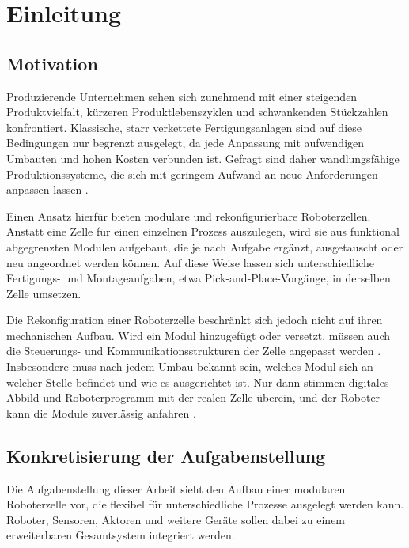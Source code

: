 \cleardoublepage
\chapter{Einleitung}
\label{ch:Einleitung}
\setcounter{page}{1}

\section{Motivation}
\label{sec:Motivation}

Produzierende Unternehmen sehen sich zunehmend mit einer steigenden Produktvielfalt, kürzeren Produktlebenszyklen und schwankenden Stückzahlen konfrontiert. Klassische, starr verkettete Fertigungsanlagen sind auf diese Bedingungen nur begrenzt ausgelegt, da jede Anpassung mit aufwendigen Umbauten und hohen Kosten verbunden ist. Gefragt sind daher wandlungsfähige Produktionssysteme, die sich mit geringem Aufwand an neue Anforderungen anpassen lassen \cite{Borgmann2026,Trautner2026}.

Einen Ansatz hierfür bieten modulare und rekonfigurierbare Roboterzellen. Anstatt eine Zelle für einen einzelnen Prozess auszulegen, wird sie aus funktional abgegrenzten Modulen aufgebaut, die je nach Aufgabe ergänzt, ausgetauscht oder neu angeordnet werden können. Auf diese Weise lassen sich unterschiedliche Fertigungs- und Montageaufgaben, etwa Pick-and-Place-Vorgänge, in derselben Zelle umsetzen.

Die Rekonfiguration einer Roboterzelle beschränkt sich jedoch nicht auf ihren mechanischen Aufbau. Wird ein Modul hinzugefügt oder versetzt, müssen auch die Steuerungs- und Kommunikationsstrukturen der Zelle angepasst werden \cite{Trautner2026}. Insbesondere muss nach jedem Umbau bekannt sein, welches Modul sich an welcher Stelle befindet und wie es ausgerichtet ist. Nur dann stimmen digitales Abbild und Roboterprogramm mit der realen Zelle überein, und der Roboter kann die Module zuverlässig anfahren \cite{Bennulf2025}.

\section{Konkretisierung der Aufgabenstellung}
\label{sec:Konkretisierung der Aufgabenstellung}

Die Aufgabenstellung dieser Arbeit sieht den Aufbau einer modularen Roboterzelle vor, die flexibel für unterschiedliche Prozesse ausgelegt werden kann. Roboter, Sensoren, Aktoren und weitere Geräte sollen dabei zu einem erweiterbaren Gesamtsystem integriert werden.

